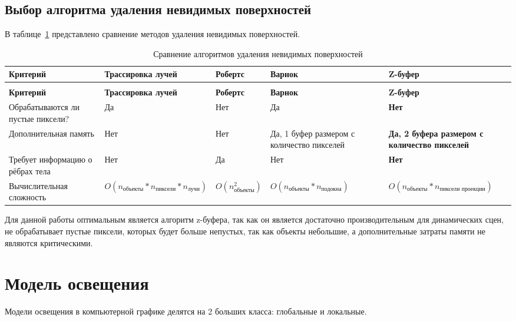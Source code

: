 \subsection*{Выбор алгоритма удаления невидимых поверхностей}

В таблице~\ref{tbl:invisible} представлено сравнение методов удаления невидимых поверхностей.

\begin{longtable}{|p{}|p{}|p{}|p{}|p{}|}
	\caption{Сравнение алгоритмов удаления невидимых поверхностей} \label{tbl:invisible} 
	\\
	\hline
	\textbf{Критерий} & \textbf{Трассировка лучей} & \textbf{Робертс} & \textbf{Варнок} & \textbf{Z-буфер} \\
	\hline
	\endfirsthead
	\caption{Сравнение алгоритмов удаления невидимых поверхностей}
	\\
	\hline
	\textbf{Критерий} & \textbf{Трассировка лучей} & \textbf{Робертс} & \textbf{Варнок} & \textbf{Z-буфер} \\
	\hline
	\endhead
	\hline
	\endfoot
	\endlastfoot
	Обрабатываются ли пустые пиксели? & Да & Нет & Да & \textbf{Нет} \\
	\hline
	Дополнительная память & Нет & Нет & Да, 1 буфер размером с количество пикселей & \textbf{Да, 2 буфера размером с количество пикселей} \\
	\hline
	Требует информацию о рёбрах тела & Нет & Да & Нет & \textbf{Нет} \\
	\hline
	Вычислительная сложность & $O(n_{\text{объекты}}*n_{\text{пиксели}} * n_{\text{лучи}})$ & $O(n_{\text{объекты}}^2)$ & $O(n_{\text{объекты}}*n_{\text{подокна}})$ & \textbf{$O(n_{\text{объекты}}*n_{\text{пиксели проекции}})$} \\
	\hline
\end{longtable}

Для данной работы оптимальным является алгоритм z-буфера, так как он является достаточно производительным для динамических сцен, не обрабатывает пустые пиксели, которых будет больше непустых, так как объекты небольшие, а дополнительные затраты памяти не являются критическими.

\section{Модель освещения}
Модели освещения в компьютерной графике делятся на 2 больших класса: глобальные и локальные.

